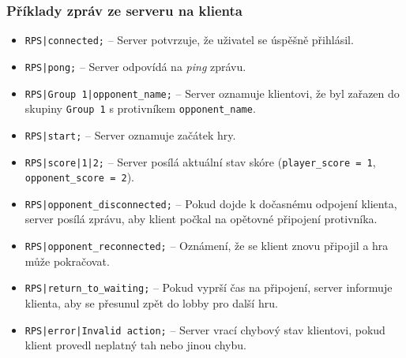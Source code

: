 \documentclass[12pt, a4paper]{article}
\begin{document}
\subsubsection{Příklady zpráv ze serveru na klienta}
\begin{itemize}
  \item \texttt{RPS|connected;} -- Server potvrzuje, že uživatel  se úspěšně přihlásil.
  \item \texttt{RPS|pong;} -- Server odpovídá na \emph{ping} zprávu.
  \item \texttt{RPS|Group 1|opponent\_name;} -- Server oznamuje klientovi, že byl zařazen do skupiny \texttt{Group 1} s protivníkem \texttt{opponent\_name}.
  \item \texttt{RPS|start;} -- Server oznamuje začátek hry.
  \item \texttt{RPS|score|1|2;} -- Server posílá aktuální stav skóre (\texttt{player\_score = 1}, \texttt{opponent\_score = 2}).
  \item \texttt{RPS|opponent\_disconnected;} -- Pokud dojde k dočasnému odpojení klienta, server posílá zprávu, aby klient počkal na opětovné připojení protivníka.
  \item \texttt{RPS|opponent\_reconnected;} -- Oznámení, že se klient znovu připojil a hra může pokračovat.
  \item \texttt{RPS|return\_to\_waiting;} -- Pokud vyprší čas na připojení, server informuje klienta, aby se přesunul zpět do lobby pro další hru.
  \item \texttt{RPS|error|Invalid action;} -- Server vrací chybový stav klientovi, pokud klient provedl neplatný tah nebo jinou chybu.
\end{itemize}
\end{document}
